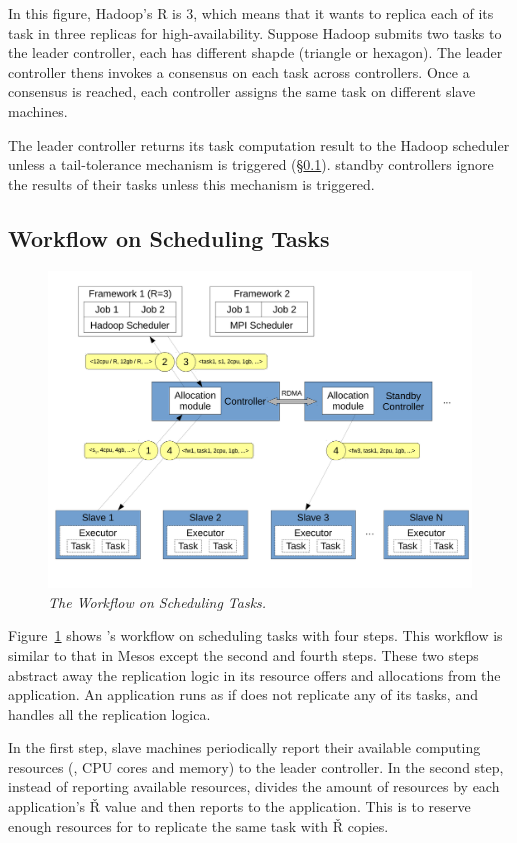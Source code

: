 In this figure, Hadoop's R is 3, which means that it wants to replica each of 
its task in three replicas for high-availability. Suppose Hadoop submits two 
tasks to the leader controller, each has different shapde (triangle or hexagon). 
The leader controller thens invokes a consensus on each task across controllers. 
Once a consensus is reached, each controller assigns the same task on different 
slave machines.

The leader controller returns its task computation result to the Hadoop 
scheduler unless a tail-tolerance mechanism is triggered 
(\S\ref{sec:workflow}). standby controllers ignore the results of their tasks 
unless this mechanism is triggered.



\subsection{Workflow on Scheduling Tasks} \label{sec:workflow}

\begin{figure}[t]
\vspace{.20in}
\centering
\includegraphics[width=.47\textwidth]{figures/flow}
\vspace{.06in}
\caption{{\em The \xxx Workflow on Scheduling Tasks.}} \label{fig:workflow}
\vspace{-.05in}
\end{figure}

Figure~\ref{fig:workflow} shows \xxx's workflow on scheduling tasks with four 
steps. This workflow is similar to that in Mesos except the second and fourth 
steps. These two steps \xxx abstract away the replication logic in its resource 
offers and allocations from the application. An application runs as if \xxx does 
not replicate any of its tasks, and \xxx handles all the replication logica.

In the first step, slave machines periodically report their available computing 
resources (\eg, CPU cores and memory) to the leader controller. In the second 
step, instead of reporting available resources, \xxx divides the amount of 
resources by each application's \v{R} value and then reports to the 
application. This is to reserve enough resources for \xxx to replicate the same 
task with \v{R} copies.

